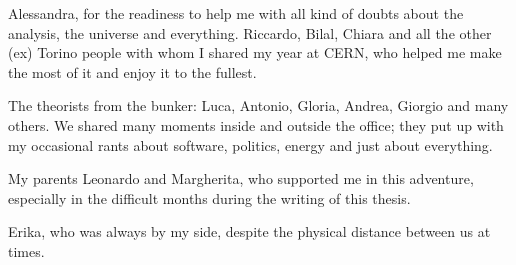 Alessandra, for the readiness to help me with all kind of doubts about the analysis, the universe and everything.
Riccardo, Bilal, Chiara and all the other (ex) Torino people with whom I shared my year at CERN, who helped me make the most of it and enjoy it to the fullest.

The theorists from the bunker: Luca, Antonio, Gloria, Andrea, Giorgio and many others.
We shared many moments inside and outside the office;
they put up with my occasional rants about software, politics, energy and just about everything.


My parents Leonardo and Margherita, who supported me in this adventure, especially in the difficult months during the writing of this thesis.

Erika, who was always by my side, despite the physical distance between us at times.
